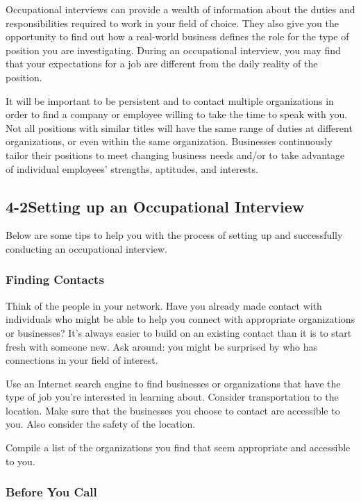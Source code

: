 Occupational interviews can provide a wealth of information about the duties and responsibilities required to work in your field of choice. They also give you the opportunity to find out how a real-world business defines the role for the type of position you are investigating. During an occupational interview, you may find that your expectations for a job are different from the daily reality of the position.

It will be important to be persistent and to contact multiple organizations in order to find a company or employee willing to take the time to speak with you. Not all positions with similar titles will have the same range of duties at different organizations, or even within the same organization. Businesses continuously tailor their positions to meet changing business needs and/or to take advantage of individual employees' strengths, aptitudes, and interests.

\pagebreak \subsection*{4-2\quad  Setting up an Occupational Interview}
Below are some tips to help you with the process of setting up and successfully conducting an occupational interview.

\subsubsection*{Finding Contacts}

Think of the people in your network. Have you already made contact with individuals who might be able to help you connect with appropriate organizations or businesses? It's always easier to build on an existing contact than it is to start fresh with someone new. Ask around: you might be surprised by who has connections in your field of interest.

Use an Internet search engine to find businesses or organizations that have the type of job you're interested in learning about. Consider transportation to the location. Make sure that the businesses you choose to contact are accessible to you. Also consider the safety of the location.

Compile a list of the organizations you find that seem appropriate and accessible to you.

\subsubsection*{Before You Call}

